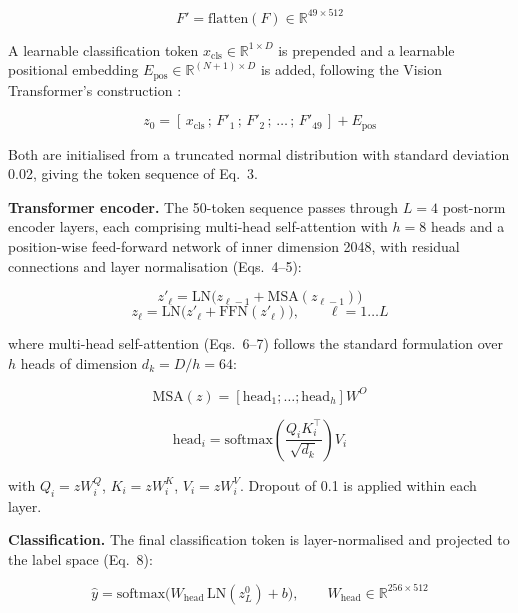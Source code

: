 \begin{equation}
F' = \text{flatten}(F) \in \mathbb{R}^{49 \times 512}
\end{equation}

A learnable classification token
\(x_{\text{cls}} \in \mathbb{R}^{1 \times D}\) is prepended and a
learnable positional embedding
\(E_{\text{pos}} \in \mathbb{R}^{(N+1) \times D}\) is added, following
the Vision Transformer's construction \citep{ref22}:

\begin{equation}
z_0 = [\,x_{\text{cls}}\,;\,F'_1\,;\,F'_2\,;\,\dots\,;\,F'_{49}\,] + E_{\text{pos}}
\end{equation}

Both are initialised from a truncated normal distribution with standard
deviation 0.02, giving the token sequence of Eq.~3.

\textbf{Transformer encoder.} The 50-token sequence passes through
\(L = 4\) post-norm encoder layers, each comprising multi-head
self-attention with \(h = 8\) heads and a position-wise feed-forward
network of inner dimension 2048, with residual connections and layer
normalisation (Eqs.~4--5):

\begin{equation}
z'_\ell = \text{LN}\big(z_{\ell-1} + \text{MSA}(z_{\ell-1})\big)
\end{equation}
\begin{equation}
z_\ell = \text{LN}\big(z'_\ell + \text{FFN}(z'_\ell)\big), \qquad \ell = 1 \dots L
\end{equation}

where multi-head self-attention (Eqs.~6--7) follows the standard
formulation \citep{ref51} over \(h\) heads of dimension
\(d_k = D/h = 64\):

\begin{equation}
\text{MSA}(z) = [\text{head}_1 ; \dots ; \text{head}_h] W^O
\end{equation}

\begin{equation}
\text{head}_i = \text{softmax}\left(\frac{Q_i K_i^{\top}}{\sqrt{d_k}}\right) V_i
\end{equation}

with \(Q_i = zW_i^Q\), \(K_i = zW_i^K\), \(V_i = zW_i^V\). Dropout of
0.1 is applied within each layer.

\textbf{Classification.} The final classification token is
layer-normalised and projected to the label space (Eq.~8):

\begin{equation}
\hat{y} = \text{softmax}\big(W_{\text{head}}\,\text{LN}(z_L^{0}) + b\big), \qquad
W_{\text{head}} \in \mathbb{R}^{256 \times 512}
\end{equation}

